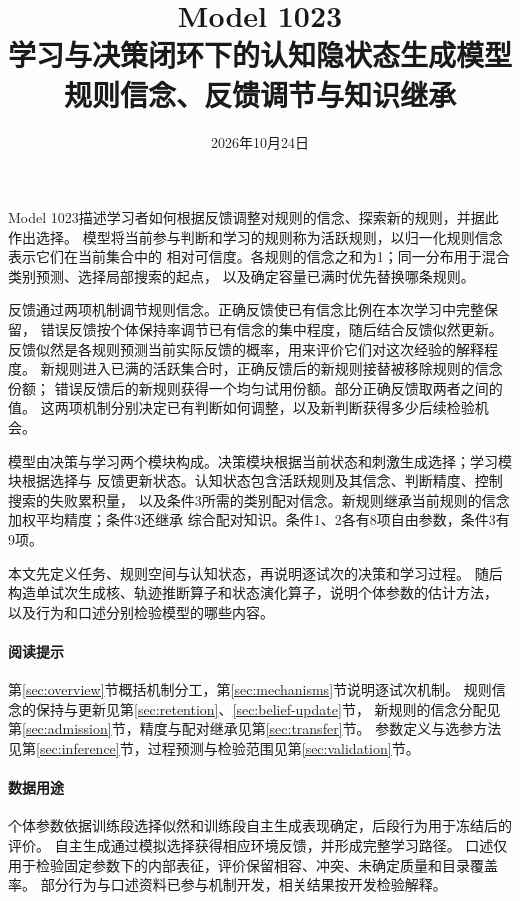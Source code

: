 \documentclass[11pt,a4paper]{article}
\title{Model 1023\\[0.5em]
\Large 学习与决策闭环下的认知隐状态生成模型\\[0.5em]
\large 规则信念、反馈调节与知识继承}
\author{}
\date{2026年10月24日}
\numberwithin{equation}{section}
\begin{document}
\maketitle
\thispagestyle{empty}


Model 1023描述学习者如何根据反馈调整对规则的信念、探索新的规则，并据此作出选择。
模型将当前参与判断和学习的规则称为活跃规则，以归一化规则信念表示它们在当前集合中的
相对可信度。各规则的信念之和为1；同一分布用于混合类别预测、选择局部搜索的起点，
以及确定容量已满时优先替换哪条规则。

反馈通过两项机制调节规则信念。正确反馈使已有信念比例在本次学习中完整保留，
错误反馈按个体保持率调节已有信念的集中程度，随后结合反馈似然更新。
反馈似然是各规则预测当前实际反馈的概率，用来评价它们对这次经验的解释程度。
新规则进入已满的活跃集合时，正确反馈后的新规则接替被移除规则的信念份额；
错误反馈后的新规则获得一个均匀试用份额。部分正确反馈取两者之间的值。
这两项机制分别决定已有判断如何调整，以及新判断获得多少后续检验机会。

模型由决策与学习两个模块构成。决策模块根据当前状态和刺激生成选择；学习模块根据选择与
反馈更新状态。认知状态包含活跃规则及其信念、判断精度、控制搜索的失败累积量，
以及条件3所需的类别配对信念。新规则继承当前规则的信念加权平均精度；条件3还继承
综合配对知识。条件1、2各有8项自由参数，条件3有9项。

本文先定义任务、规则空间与认知状态，再说明逐试次的决策和学习过程。
随后构造单试次生成核、轨迹推断算子和状态演化算子，说明个体参数的估计方法，
以及行为和口述分别检验模型的哪些内容。

\paragraph{阅读提示}
第\ref{sec:overview}节概括机制分工，第\ref{sec:mechanisms}节说明逐试次机制。
规则信念的保持与更新见第\ref{sec:retention}、\ref{sec:belief-update}节，
新规则的信念分配见第\ref{sec:admission}节，精度与配对继承见第\ref{sec:transfer}节。
参数定义与选参方法见第\ref{sec:inference}节，过程预测与检验范围见第\ref{sec:validation}节。

\paragraph{数据用途}
个体参数依据训练段选择似然和训练段自主生成表现确定，后段行为用于冻结后的评价。
自主生成通过模拟选择获得相应环境反馈，并形成完整学习路径。
口述仅用于检验固定参数下的内部表征，评价保留相容、冲突、未确定质量和目录覆盖率。
部分行为与口述资料已参与机制开发，相关结果按开发检验解释。
\end{document}
